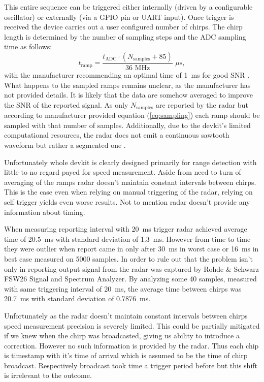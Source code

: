 This entire sequence can be triggered either internally (driven by a configurable oscillator) or externally (via a GPIO pin or UART input).
Once trigger is received the device carries out a user configured number of chirps.
The chirp length is determined by the number of sampling steps and the ADC sampling time as follows:
\begin{equation}
  t_\mathrm{ramp} = \frac{t_\mathrm{ADC} \cdot  (N_\mathrm{samples} + 85)}{36\,\, \mathrm{MHz}} \,\, \mu\mathrm{s},
  \label{eq:sampling}
\end{equation}
with the manufacturer recommending an optimal time of 1~ms for good SNR \cite{sidarPRO}.
What happens to the sampled ramps remains unclear, as the manufacturer has not provided details.
It is likely that the data are somehow averaged to improve the SNR of the reported signal.
As only $N_\mathrm{samples}$ are reported by the radar but according to manufacturer provided equation (\ref{eq:sampling}) each ramp should be sampled with that number of samples.
Additionally, due to the devkit's limited computational resources, the radar does not emit a continuous sawtooth waveform but rather a segmented one \cite{sidarPRO}.

Unfortunately whole devkit is clearly designed primarily for range detection with little to no regard payed for speed measurement.
Aside from need to turn of averaging of the ramps radar doesn't maintain constant intervals between chirps.
This is the case even when relying on manual triggering of the radar, relying on self trigger yields even worse results.
Not to mention radar doesn't provide any information about timing.

When measuring reporting interval with 20~ms trigger radar achieved average time of 20.5~ms with standard deviation of 1.3~ms.
However from time to time they were outlier when report came in only after 30~ms in worst case or 16~ms in best case measured on 5000 samples.
In order to rule out that the problem isn't only in reporting output signal from the radar was captured by Rohde \& Schwarz FSW26 Signal and Spectrum Analyzer.
By analyzing some 40 samples, measured with same triggering interval of 20~ms, the average time between chirps was 20.7~ms with standard deviation of 0.7876~ms.

Unfortunately as the radar doesn't maintain constant intervals between chirps speed measurement precision is severely limited.
This could be partially mitigated if we knew when the chirp was broadcasted, giving us ability to introduce a correction.
However no such information is provided by the radar.
Thus each chip is timestamp with it's time of arrival which is assumed to be the time of chirp broadcast.
Respectively broadcast took time a trigger period before but this shift is irrelevant to the outcome.

